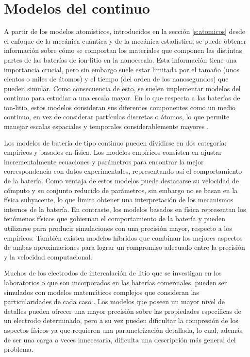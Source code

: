 \section{Modelos del continuo}

A partir de los modelos atomísticos, introducidos en la sección \ref{s:atomicos} desde 
el enfoque de la mecánica cuántica y de la mecánica estadística, se puede obtener
información sobre cómo se comportan los materiales que componen las
distintas partes de las baterías de ion-litio en la nanoescala. Esta información 
tiene una importancia crucial, pero sin embargo suele estar limitada por el tamaño
(unos cientos o miles de átomos) y el tiempo (del orden de los nanosegundos) que 
pueden simular. Como consecuencia de esto, se suelen implementar modelos del 
continuo para estudiar a una escala mayor. En lo que respecta a las baterías de 
ion-litio, estos modelos consideran sus diferentes componentes como un medio 
continuo, en vez de considerar partículas discretas o átomos, lo que permite
manejar escalas espaciales y temporales considerablemente mayores \cite{brosa2022}.

Los modelos de batería de tipo continuo pueden dividirse en dos categoría:
empíricos y basados en física. Los modelos empíricos consisten en ajustar 
incrementalmente ecuaciones y parámetros para encontrar la mejor correspondencia
con datos experimentales, representando así el comportamiento de la batería. 
Como ventaja de estos modelos puede destacarse su velocidad de cómputo y su
conjunto reducido de parámetros, sin embargo no se basan en la física subyacente, 
lo que limita obtener una interpretación de los mecanismos internos de la batería.
En contraste, los modelos basados en física representan los fenómenos físicos 
que gobiernan el comportamiento de la batería y pueden utilizarse para producir 
simulaciones con una precisión mayor, respecto a los empíricos. También existen
modelos híbridos que combinan los mejores aspectos de ambas aproximaciones para 
lograr un compromiso adecuado entre la precisión y la velocidad computacional.

Muchos de los electrodos de intercalación de litio que se investigan en los 
laboratorios o que son incorporados en las baterías comerciales, pueden ser 
simulados con modelos matemáticos complejos que consideran las particularidades 
de cada caso \cite{doyle1995}. Los modelos que poseen un mayor nivel de detalles 
pueden ofrecer una mayor precisión sobre las propiedades 
específicas de un electrodo determinado, pero a su vez pueden dificultar la 
compresión de los aspectos físicos ya que requieren una parametrización detallada, 
lo cual, además de ser una carga a veces innecesaria, dificulta una descripción 
más general del problema. 



